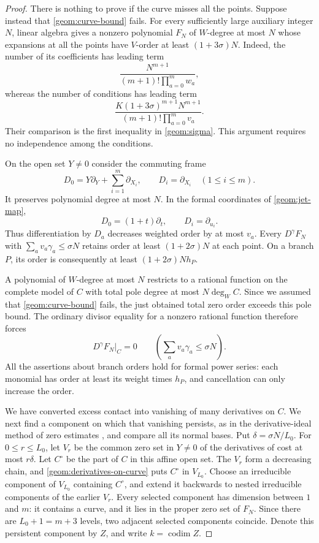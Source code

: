 \documentclass[11pt]{article}
\theoremstyle{definition}
\theoremstyle{remark}
\numberwithin{equation}{section}
\begin{document}
\begin{proof}
There is nothing to prove if the curve misses all the points. Suppose
instead that \eqref{geom:curve-bound} fails. For every sufficiently large
auxiliary integer $N$, linear algebra gives a nonzero polynomial $F_N$
of $W$-degree at most $N$ whose expansions at all the points have
$V$-order at least $(1+3\sigma)N$. Indeed, the number of its coefficients
has leading term
\[
 \frac{N^{m+1}}{(m+1)!\prod_{a=0}^m w_a},
\]
whereas the number of conditions has leading term
\[
 \frac{K(1+3\sigma)^{m+1}N^{m+1}}
      {(m+1)!\prod_{a=0}^m v_a}.
\]
Their comparison is the first inequality in \eqref{geom:sigma}. This
argument requires no independence among the conditions.

On the open set $Y\ne0$ consider the commuting frame
\begin{equation}
\label{geom:frame}
 D_0=Y\partial_Y+\sum_{i=1}^m\partial_{X_i},\qquad
 D_i=\partial_{X_i}\quad(1\le i\le m).
\end{equation}
It preserves polynomial degree at most $N$. In the formal coordinates of
\eqref{geom:jet-map},
\[
 D_0=(1+t)\partial_t,\qquad D_i=\partial_{u_i}.
\]
Thus differentiation by $D_a$ decreases weighted order by at most $v_a$.
Every $D^\gamma F_N$ with $\sum_av_a\gamma_a\le\sigma N$ retains
order at least $(1+2\sigma)N$ at each point. On a branch $P$, its order
is consequently at least $(1+2\sigma)N h_P$.

A polynomial of $W$-degree at most $N$ restricts to a rational function
on the complete model of $C$ with total pole degree at most
$N\deg_W C$. Since we assumed that \eqref{geom:curve-bound} fails, the
just obtained total zero order exceeds this pole bound. The ordinary
divisor equality for a nonzero rational function therefore forces
\begin{equation}
\label{geom:derivatives-on-curve}
 D^\gamma F_N\big|_C=0
 \qquad\left(\sum_av_a\gamma_a\le\sigma N\right).
\end{equation}
All the assertions about branch orders hold for formal power series:
each monomial has order at least its weight times $h_P$, and
cancellation can only increase the order.

We have converted excess contact into vanishing of many derivatives on
$C$. We next find a component on which that vanishing persists, as in
the derivative-ideal method of zero estimates
\cite[Section~5]{philippon1986}, and compare all its normal bases.
Put $\delta=\sigma N/L_0$. For $0\le r\le L_0$, let $V_r$ be the common
zero set in $Y\ne0$ of the derivatives of cost at most $r\delta$.
Let $C^\circ$ be the part of $C$ in this affine open set. The $V_r$
form a decreasing chain, and \eqref{geom:derivatives-on-curve} puts
$C^\circ$ in $V_{L_0}$. Choose an irreducible component of $V_{L_0}$ containing
$C^\circ$, and extend it backwards to nested irreducible components of the
earlier $V_r$. Every selected component has dimension between $1$ and
$m$: it contains a curve, and it lies in the proper zero set of
$F_N$. Since there are $L_0+1=m+3$ levels, two adjacent selected
components coincide. Denote this persistent component by $Z$, and
write $k=\operatorname{codim}Z$.


\end{proof}
\end{document}
